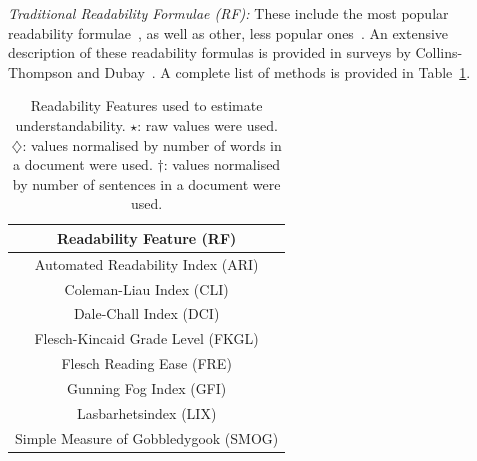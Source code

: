 \documentclass[10pt,a4paper]{article}
\begin{document}
%	





\textit{Traditional Readability Formulae (RF):}
These include the most popular readability formulae~\cite{cli75,dale48,flesch75}, as well as other, less popular ones~\cite{ari67,gunning52,lix,smog69}. An extensive description of these readability formulas is provided in surveys by Collins-Thompson \cite{collins2014computational} and Dubay~\cite{dubay04}. A complete list of methods is provided in Table~\ref{tab:doc_features_rf}.

\begin{table}
	\caption{Readability Features used to estimate understandability. $\star$: raw values were
		used. $\diamondsuit$: values normalised by number of words in a document
		were used. $\dagger$: values normalised by number of sentences in
		a document were used.}
	\label{tab:doc_features_rf} \vspace{-10pt}
	\begin{tabular}{|c|}
		\toprule 
		\textbf{Readability Feature (RF)}\tabularnewline
		\midrule
		Automated Readability Index (ARI) \cite{ari67} \tabularnewline
		Coleman-Liau Index (CLI) \cite{cli75} \tabularnewline
		Dale-Chall Index (DCI) \cite{dale48} \tabularnewline
		Flesch-Kincaid Grade Level (FKGL) \cite{flesch75} \tabularnewline
		Flesch Reading Ease (FRE) \cite{flesch75} \tabularnewline
		Gunning Fog Index (GFI) \cite{gunning52} \tabularnewline
		Lasbarhetsindex (LIX) \cite{lix} \tabularnewline
		Simple Measure of Gobbledygook (SMOG) \cite{smog69} \tabularnewline
		\bottomrule 
	\end{tabular}
\end{table}
\end{document}
